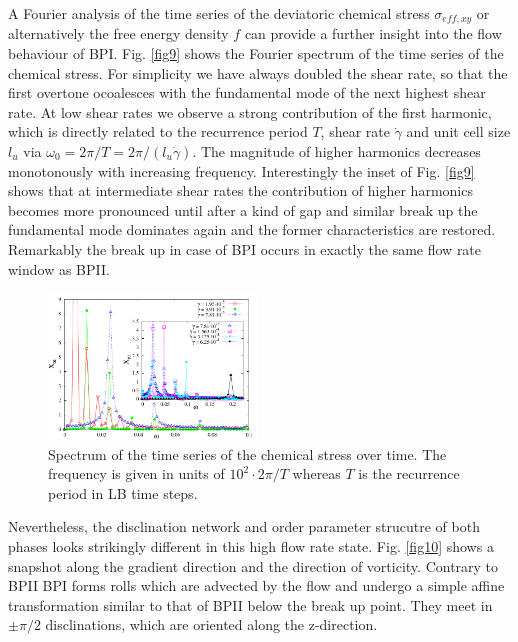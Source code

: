 \documentclass[aps,pre,reprint,superscriptaddress]{revtex4}
\begin{document}
A Fourier analysis of the time series of the deviatoric chemical stress $\sigma_{eff,xy}$ or alternatively the free energy density $f$ can provide a further insight into the flow behaviour of BPI.
Fig. \ref{fig9} shows the Fourier spectrum of the time series of the chemical stress.
For simplicity we have always doubled the shear rate, so that the first overtone ocoalesces with the fundamental mode of the next highest shear rate. 
At low shear rates we observe a strong contribution of the first harmonic, which is directly related to the recurrence period $T$, shear rate $\dot{\gamma}$ and unit cell size $l_{u}$ via $\omega_0=2\pi/T=2\pi/(l_{u}\dot{\gamma})$.
The magnitude of higher harmonics decreases monotonously with increasing frequency.
Interestingly the inset of Fig. \ref{fig9} shows that at intermediate shear rates the contribution of higher harmonics becomes more pronounced until after a kind of gap and similar break up the fundamental mode dominates again and the former characteristics are restored.
Remarkably the break up in case of BPI occurs in exactly the same flow rate window as BPII.

\begin{figure}[h]
\includegraphics[width=0.495\textwidth]{spectrum_bp1.pdf}
\caption{Spectrum of the time series of the chemical stress over time. The frequency is given in units of $10^2\cdot 2\pi/T$ whereas $T$ is the recurrence period in LB time steps.}
\label{bp1-spec}
\end{figure}

Nevertheless, the disclination network and order parameter strucutre of both phases looks strikingly different in this high flow rate state.
Fig. \ref{fig10} shows a snapshot along the gradient direction and the direction of vorticity.
Contrary to BPII BPI forms rolls which are advected by the flow and undergo a simple affine transformation similar to that of BPII below the break up point.
They meet in $\pm\pi/2$ disclinations, which are oriented along the z-direction.
\end{document}
